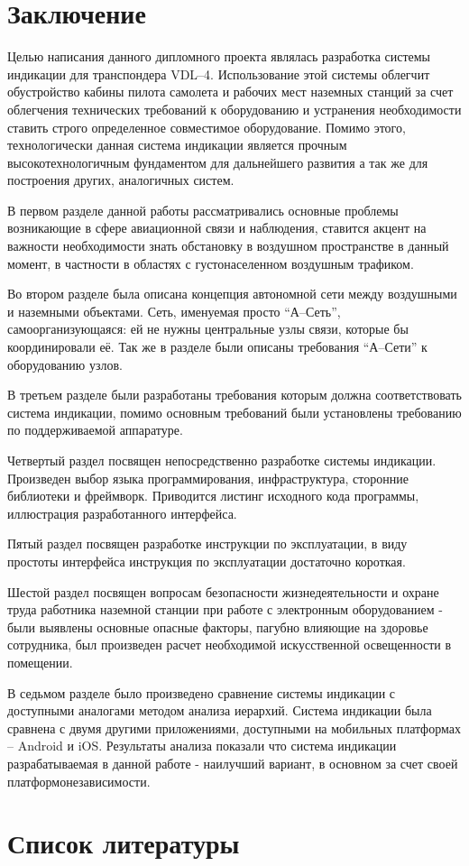 \documentclass[a4paper,12pt]{report} %
\begin{document}
\newpage
\chapter*{Заключение}

Целью написания данного дипломного проекта являлась разработка системы индикации
для транспондера VDL--4. Использование этой системы облегчит обустройство кабины
пилота самолета и рабочих мест наземных станций за счет облегчения технических
требований к оборудованию и устранения необходимости ставить строго определенное
совместимое оборудование. Помимо этого, технологически данная система индикации
является прочным высокотехнологичным фундаментом для дальнейшего развития а так
же для построения других, аналогичных систем.

В первом разделе данной работы рассматривались основные проблемы возникающие в
сфере авиационной связи и наблюдения, ставится акцент на важности необходимости
знать обстановку в воздушном пространстве в данный момент, в частности в
областях с густонаселенном воздушным трафиком.

Во втором разделе была описана концепция автономной сети между воздушными и
наземными объектами. Сеть, именуемая просто ``А--Сеть'', самоорганизующаяся: ей
не нужны центральные узлы связи, которые бы координировали её. Так же в разделе
были описаны требования ``А--Сети'' к оборудованию узлов.

В третьем разделе были разработаны требования которым должна соответствовать
система индикации, помимо основным требований были установлены требованию по
поддерживаемой аппаратуре.

Четвертый раздел посвящен непосредственно разработке системы индикации.
Произведен выбор языка программирования, инфраструктура, сторонние библиотеки и
фреймворк. Приводится листинг исходного кода программы, иллюстрация
разработанного интерфейса.

Пятый раздел посвящен разработке инструкции по эксплуатации, в виду простоты
интерфейса инструкция по эксплуатации достаточно короткая.

Шестой раздел посвящен вопросам безопасности жизнедеятельности и охране труда
работника наземной станции при работе с электронным оборудованием - были
выявлены основные опасные факторы, пагубно влияющие на здоровье сотрудника, был
произведен расчет необходимой искусственной освещенности в помещении.

В седьмом разделе было произведено сравнение системы индикации с доступными
аналогами методом анализа иерархий. Система индикации была сравнена с двумя
другими приложениями, доступными на мобильных платформах -- Android и iOS.
Результаты анализа показали что система индикации разрабатываемая в данной
работе - наилучший вариант, в основном за счет своей платформонезависимости.
\newpage

\chapter*{Список литературы}
\end{document}
